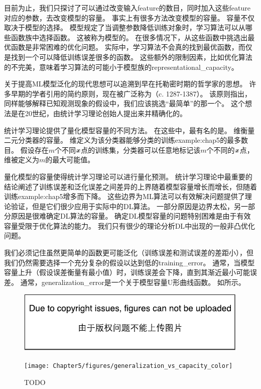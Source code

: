 
目前为止，我们只探讨了可以通过改变输入\gls{feature}的数目，同时加入这些\gls{feature}对应的参数，去改变模型的容量。
事实上有很多方法改变模型的容量。
容量不仅取决于模型的选择。
模型规定了当调整参数降低训练对象时，学习算法可以从哪些函数族中选择函数。
这被称为模型的。
在很多情况下，从这些函数中挑选出最优函数是非常困难的优化问题。
实际中，学习算法不会真的找到最优函数，而仅是找到一个可以降低训练误差很多的函数。
这些额外的限制因素，比如优化算法的不完美，意味着学习算法的可能小于模型族的\gls{representational_capacity}。


关于提高\gls{ML}模型泛化的现代思想可以追溯到早在托勒密时期的哲学家的思想。
许多早期的学者引用的简约原则，现在被广泛称为（c. 1287-1387）。
该原则指出，同样能够解释已知观测现象的假设中，我们应该挑选“最简单”的那一个。
这个想法是在20世纪，由统计学习理论创始人提出来并精确化的\citep{Vapnik71,Vapnik82,Blumer-et-al-1989,Vapnik95}。

统计学习理论提供了量化模型容量的不同方法。
在这些中，最有名的是。
维衡量二元分类器的容量。
维定义为该分类器能够分类的训练\gls{example:chap5}的最多数目。
假设存在$m$个不同$\boldsymbol{\mathit{x}}$点的训练集，分类器可以任意地标记该$m$个不同的$\boldsymbol{\mathit{x}}$点，维被定义为$m$的最大可能值。

量化模型的容量使得统计学习理论可以进行量化预测。
统计学习理论中最重要的结论阐述了训练误差和泛化误差之间差异的上界随着模型容量增长而增长，但随着训练\gls{example:chap5}增多而下降\citep{Vapnik71,Vapnik82,Blumer-et-al-1989,Vapnik95}。
这些边界为\gls{ML}算法可以有效解决问题提供了理论验证，但是它们很少应用于实际中的\gls{DL}算法。
一部分原因是边界太松，另一部分原因是很难确定\gls{DL}算法的容量。
确定\gls{DL}模型容量的问题特别困难是由于有效容量受限于优化算法的能力。
我们只有很少的理论分析\gls{DL}中出现的一般非凸优化问题。

我们必须记住虽然更简单的函数更可能泛化（训练误差和测试误差的差距小），但我们仍然需要选择一个充分复杂的假设以达到低的\gls{training_error}。
通常，当模型容量上升（假设误差衡量有最小值）时，训练误差会下降，直到其渐近最小可能误差。
通常，\gls{generalization_error}是一个关于模型容量U形曲线函数。
如所示。

\begin{figure}[!htb]
\ifOpenSource
\centerline{\includegraphics{figure.pdf}}
\else
\centerline{\texttt{[image: Chapter5/figures/generalization\_vs\_capacity\_color]}}
\fi
\caption{TODO}
\label{fig:chap5_generalization_vs_capacity}
\end{figure}

